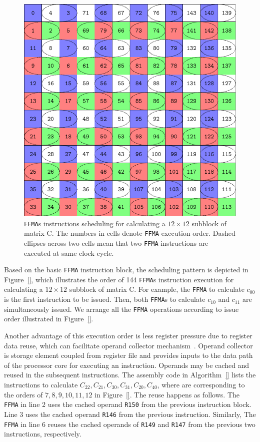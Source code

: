 \documentclass{sig-alternate-05-2015}
\begin{document}
\begin{figure}[htbp]
\begin{center}
\includegraphics[scale=0.5]{order}
\caption{{\tt FFMA}s instructions scheduling for calculating a $12\times 12$ subblock of matrix C.  The numbers in cells denote {\tt FFMA} execution order. Dashed ellipses across two cells mean that two {\tt FFMA} instructions are executed at same clock cycle.}
\label{fig:order}
\end{center}
\end{figure}

Based on the basic {\tt FFMA} instruction block, the scheduling pattern is depicted in Figure~\ref{}, which illustrates the order of 144 {\tt FFMA}s instruction execution for calculating a $12\times 12$ subblock of matrix C. For example, the {\tt FFMA} to calculate $c_{00}$ is the first instruction to be issued. Then, both {\tt FFMA}s to calculate $c_{10}$ and  $c_{11}$ are simultaneously issued. We arrange all the {\tt FFMA} operations according to issue order illustrated in Figure~\ref{}.

Another advantage of this execution order is less register pressure due to register data reuse, which can facilitate operand collector mechanism~\cite{}. Operand collector is storage element coupled from register file and provides inputs to the data path of the processor core for executing an instruction. Operands may be cached and reused in the subsequent instructions. The assembly code in Algorithm~\ref{} lists the instructions to calculate $C_{22}, C_{21}, C_{30}, C_{31}, C_{20}, C_{40}$, where are corresponding to the orders of $7,8,9,10,11,12$ in Figure~\ref{}. The reuse happens as follows. The {\tt FFMA} in line 2 uses the cached operand {\tt R150} from the previous instruction block. Line 3 uses the cached operand {\tt R146} from the previous instruction. Similarly, The {\tt FFMA} in line 6 reuses the cached operands of   {\tt R149} and {\tt R147} from the previous two instructions, respectively.
\end{document}
